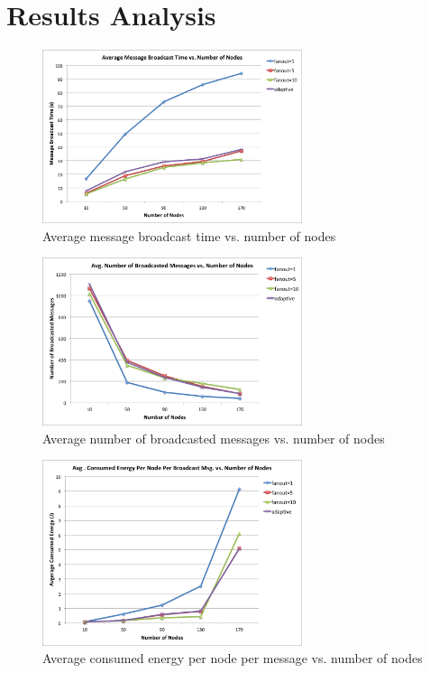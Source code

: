 \section{Results Analysis}


\begin{figure}
	\centering
	\includegraphics[width=3in]{brTime.png}
	\caption{Average message broadcast time vs. number of nodes}
	\label{fig:brTime}
\end{figure}

\begin{figure}
	\centering
	\includegraphics[width=3in]{brNum.png}
	\caption{Average number of broadcasted messages vs. number of nodes}
	\label{fig:brNum}
\end{figure}

\begin{figure}
	\centering
	\includegraphics[width=3in]{energy.png}
	\caption{Average consumed energy per node per message vs. number of nodes}
	\label{fig:energy}
\end{figure}

